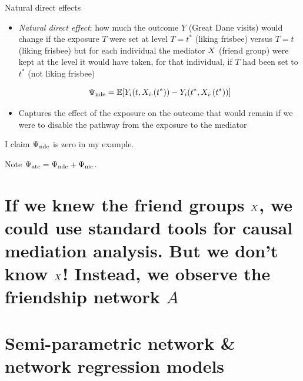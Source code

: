 \documentclass{beamer}
\theoremstyle{remark}
\begin{document}
\begin{frame}{Natural direct effects}

    \begin{itemize}
        \item \emph{Natural direct effect}: how much the outcome $Y$ (Great Dane visits) would change if the exposure $T$ were set at level $T = t^*$ (liking frisbee) versus $T = t$ (liking frisbee) but for each individual the mediator $X$ (friend group) were kept at the level it would have taken, for that individual, if $T$ had been set to $t^*$ (not liking frisbee)

              \begin{equation*}
                  \nde = \E{Y_i (t, \X_{i \cdot}(t^*)) - Y_i (t^*, \X_{i \cdot} (t^*))}
              \end{equation*}

        \item Captures the effect of the exposure on the outcome that would remain if we were to disable the pathway from the exposure to the mediator

    \end{itemize}

    I claim $\Psi_\mathrm{nde}$ is zero in my example.

    Note $\Psi_\mathrm{ate} = \Psi_\mathrm{nde} + \Psi_\mathrm{nie}$.

\end{frame}

\section{If we knew the friend groups $X$, we could use standard tools for causal mediation analysis. But we don't know $X$! Instead, we observe the friendship network $A$}

\section{Semi-parametric network \& network regression models}
\end{document}
